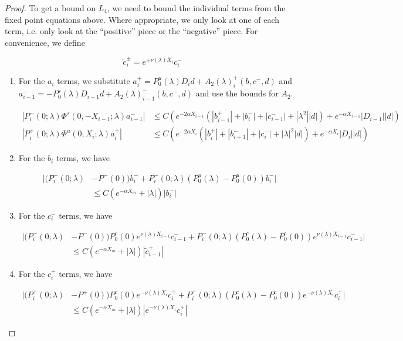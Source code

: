 \documentclass[thesis.tex]{subfiles}
\begin{document}
\begin{lemma}
\begin{proof}
To get a bound on $L_4$, we need to bound the individual terms from the fixed point equations above. Where appropriate, we only look at one of each term, i.e. only look at the ``positive'' piece or the ``negative'' piece. For convenience, we define

\[
\tilde{c}_i^\pm = e^{\pm \nu(\lambda) X_i} c_i^-
\]

\begin{enumerate}

\item For the $a_i$ terms, we substitute $a_i^+ = P_0^u(\lambda) D_i d + A_2(\lambda)_i^+(b, c^-, d)$ and $a_{i-1}^- = -P_0^s(\lambda) D_{i-1} d + A_2(\lambda)_{i-1}^-(b, c^-, d)$ and use the bounds for $A_2$.

\begin{align*}
|P_i^-(0; \lambda) \Phi^s(0, -X_{i-1}; \lambda) a_{i-1}^-| 
&\leq C \left( e^{-2 \alpha X_{i-1}} (|b_{i-1}^+| + |b_i^-| + |c_{i-1}^-| + |\lambda^2||d|) + e^{- \alpha X_{i-1}} |D_{i-1}||d| \right)\\
|P_i^+(0; \lambda) \Phi^u(0, X_i; \lambda) a_i^+| 
&\leq C \left( e^{-2 \alpha X_i} (|b_i^+| + |b_{i+1}^-| + |c_i^-| + |\lambda|^2|d|) + e^{-\alpha X_i}|D_i||d| \right)
\end{align*}

\item For the $b_i$ terms, we have

\begin{align*}
|(P_i^-(0; \lambda) &- P^-(0))b_i^- + P_i^-(0; \lambda)(P_0^u(\lambda) - P_0^u(0))b_i^-| \\
&\leq C ( e^{-\alpha X_m} + |\lambda|)|b_i^-|
\end{align*}

\item For the $c_i^-$ terms, we have

\begin{align*}
|(P_i^-(0; \lambda) &- P^-(0)) P_0^c(0) e^{\nu(\lambda) X_{i-1}} c_{i-1}^- + P_i^-(0; \lambda) (P_0^c(\lambda) - P_0^c(0)) e^{\nu(\lambda) X_{i-1}} c_{i-1}^- | \\
&\leq C (e^{-\alpha X_m} + |\lambda|)|\tilde{c}_{i-1}^+|
\end{align*}

\item For the $c_i^+$ terms, we have

\begin{align*}
|(P_i^+(0; \lambda) &- P^+(0))P_0^c(0) e^{-\nu(\lambda)X_i} c_i^+ + P_i^+(0; \lambda) (P_0^c(\lambda) - P_0^c(0)) e^{-\nu(\lambda)X_i} c_i^+| \\
&\leq C (e^{-\alpha X_m} + |\lambda|)|e^{-\nu(\lambda)X_i} c_i^+|
\end{align*}


\end{enumerate}
\end{proof}
\end{lemma}
\end{document}
